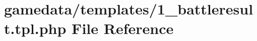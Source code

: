 \hypertarget{1__battleresult_8tpl_8php}{\section{gamedata/templates/1\+\_\+battleresult.tpl.\+php File Reference}
\label{1__battleresult_8tpl_8php}
}

